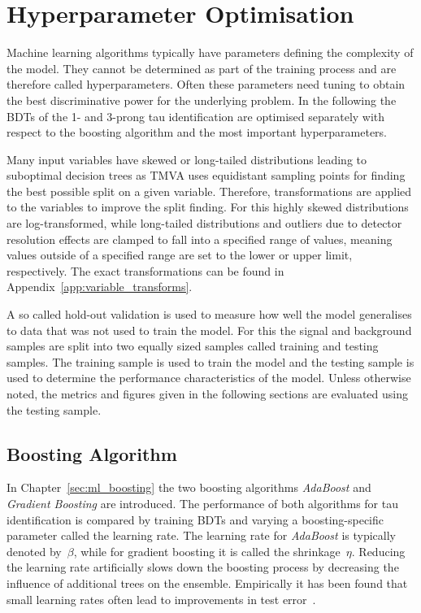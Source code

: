 \section{Hyperparameter Optimisation}
\label{sec:bdt_hyperparam}

Machine learning algorithms typically have parameters defining the complexity of
the model. They cannot be determined as part of the training process and are
therefore called hyperparameters. Often these parameters need tuning to obtain
the best discriminative power for the underlying problem. In the following the
BDTs of the 1- and 3-prong tau identification are optimised separately with
respect to the boosting algorithm and the most important hyperparameters.

Many input variables have skewed or long-tailed distributions leading to
suboptimal decision trees as TMVA uses equidistant sampling points for finding
the best possible split on a given variable. Therefore, transformations are
applied to the variables to improve the split finding. For this highly skewed
distributions are log-transformed, while long-tailed distributions and outliers
due to detector resolution effects are clamped to fall into a specified range of
values, meaning values outside of a specified range are set to the lower or
upper limit, respectively. The exact transformations can be found in
Appendix~\ref{app:variable_transforms}.

A so called hold-out validation is used to measure how well the model
generalises to data that was not used to train the model. For this the signal
and background samples are split into two equally sized samples called training
and testing samples. The training sample is used to train the model and the
testing sample is used to determine the performance characteristics of the
model. Unless otherwise noted, the metrics and figures given in the following
sections are evaluated using the testing sample.

\subsection{Boosting Algorithm}
\label{sec:bdt_boosting}

In Chapter~\ref{sec:ml_boosting} the two boosting algorithms \emph{AdaBoost} and
\emph{Gradient Boosting} are introduced. The performance of both algorithms for
tau identification is compared by training BDTs and varying a boosting-specific
parameter called the learning rate. The learning rate for \emph{AdaBoost} is
typically denoted by~$\beta$, while for gradient boosting it is called the
shrinkage~$\eta$. Reducing the learning rate artificially slows down the
boosting process by decreasing the influence of additional trees on the
ensemble. Empirically it has been found that small learning rates often lead to
improvements in test error~\cite{esl}.

